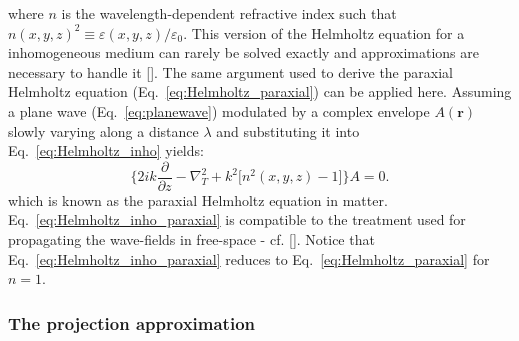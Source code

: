 \begin{refsection}
where $n$ is the wavelength-dependent refractive index such that $n(x,y,z)^2\equiv\varepsilon(x,y,z)/\varepsilon_0$. This version of the Helmholtz equation for a inhomogeneous medium can rarely be solved exactly and approximations are necessary to handle it [\cite[\textit{§2.1}]{Paganin2006}]. The same argument used to derive the paraxial Helmholtz equation (Eq.~\ref{eq:Helmholtz_paraxial}) can be applied here. Assuming a plane wave (Eq.~\ref{eq:planewave}) modulated by a complex envelope $A(\textbf{r})$ slowly varying along a distance $\lambda$ and substituting it into Eq.~\ref{eq:Helmholtz_inho} yields:
\begin{equation}\label{eq:Helmholtz_inho_paraxial}
    \Bigg\{2ik\frac{\partial}{\partial z}-\nabla^2_T+k^2\big[n^2(x,y,z)-1\big]\Bigg\}A=0.
\end{equation}{}
which is known as the paraxial Helmholtz equation in matter. Eq.~\ref{eq:Helmholtz_inho_paraxial} is compatible to the treatment used for propagating the wave-fields in free-space - cf. [\cite[\textit{Eq.~2.33}]{Paganin2006}]. Notice that Eq.~\ref{eq:Helmholtz_inho_paraxial} reduces to Eq.~\ref{eq:Helmholtz_paraxial} for $n=1$.

\subsubsection*{The projection approximation}


\end{refsection}

